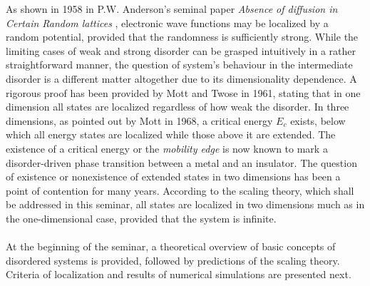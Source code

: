 \documentclass[10pt,a4paper]{article}
\begin{document}
\noindent 
As shown in 1958 in P.W. Anderson's seminal paper \emph{Absence of diffusion in Certain Random lattices} \cite{Anderson}, electronic wave functions may be localized by a random potential, provided that the randomness is sufficiently strong. While the limiting cases of weak and strong disorder can be grasped intuitively in a rather straightforward manner, the question of system's behaviour in the intermediate disorder is a different matter altogether due to its dimensionality dependence. A rigorous proof has been provided by Mott and Twose in 1961, stating that in one dimension all states are localized regardless of how weak the disorder. In three dimensions, as pointed out by Mott in 1968, a critical energy $E_c$ exists, below which all energy states are localized while those above it are extended. The existence of a critical energy or the \emph{mobility edge} is now known to mark a disorder-driven phase transition between a metal and an insulator. The question of existence or nonexistence of extended states in two dimensions has been a point of contention for many years. According to the scaling theory, which shall be addressed in this seminar, all states are localized in two dimensions much as in the one-dimensional case, provided that the system is infinite. \\\\
\noindent At the beginning of the seminar, a theoretical overview of basic concepts of disordered systems is provided, followed by predictions of the scaling theory. Criteria of localization and results of numerical simulations are presented next. 


\end{document}
